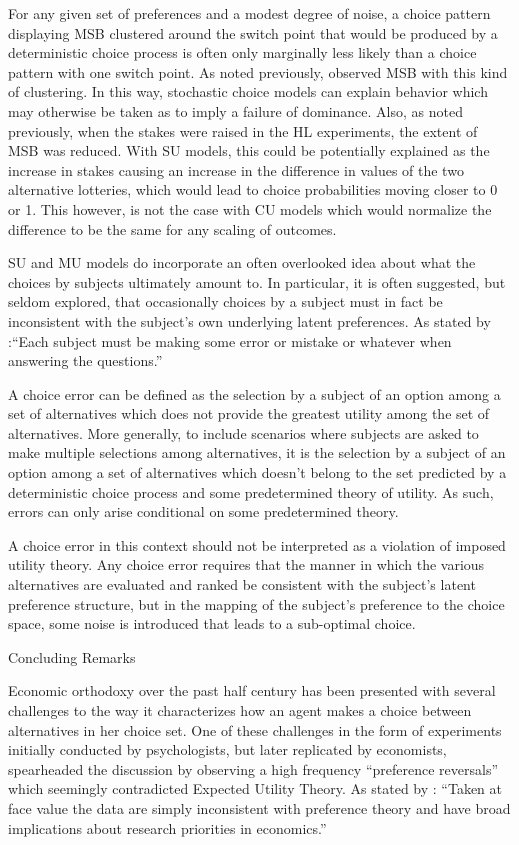 For any given set of preferences and a modest degree of noise, a choice pattern displaying MSB clustered around the switch point that would be produced by a deterministic choice process is often only marginally less likely than a choice pattern with one switch point.
As noted previously, \textcite[1648]{Holt2002} observed MSB with this kind of clustering.
In this way, stochastic choice models can explain behavior which may otherwise be taken as to imply a failure of dominance.
Also, as noted previously, when the stakes were raised in the HL experiments, the extent of MSB was reduced.
With SU models, this could be potentially explained as the increase in stakes causing an increase in the difference in values of the two alternative lotteries, which would lead to choice probabilities moving closer to 0 or 1.
This however, is not the case with CU models which would normalize the difference to be the same for any scaling of outcomes.


SU and MU models do incorporate an often overlooked idea about what the choices by subjects ultimately amount to.
In particular, it is often suggested, but seldom explored, that occasionally choices by a subject must in fact be inconsistent with the subject's own underlying latent preferences.
As stated by \textcite{Holt1986}⁠:\enquote{Each subject must be making some error or mistake or whatever when answering the questions.}

A choice error can be defined as the selection by a subject of an option among a set of alternatives which does not provide the greatest utility among the set of alternatives.
More generally, to include scenarios where subjects are asked to make multiple selections among alternatives, it is the selection by a subject of an option among a set of alternatives which doesn't belong to the set predicted by a deterministic choice process and some predetermined theory of utility.
As such, errors can only arise conditional on some predetermined theory.


A choice error in this context should not be interpreted as a violation of imposed utility theory.
Any choice error requires that the manner in which the various alternatives are evaluated and ranked be consistent with the subject's latent preference structure, but in the mapping of the subject's preference to the choice space, some noise is introduced that leads to a sub-optimal choice.


Concluding Remarks

Economic orthodoxy over the past half century has been presented with several challenges to the way it characterizes how an agent makes a choice between alternatives in her choice set.
One of these challenges in the form of experiments initially conducted by psychologists, but later replicated by economists, spearheaded the discussion by observing a high frequency \enquote{preference reversals} which seemingly contradicted Expected Utility Theory.
As stated by \textcite{Grether1979}: \enquote{Taken at face value the data are simply inconsistent with preference theory and have broad implications about research priorities in economics.}

